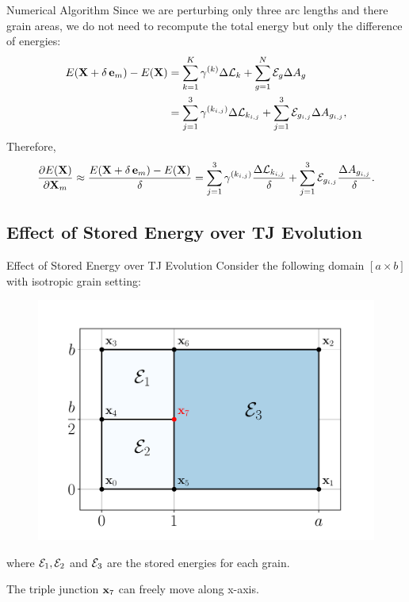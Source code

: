 \documentclass[usenames,dvipsnames]{beamer}
\begin{document}
\begin{frame}{Numerical Algorithm}
Since we are perturbing only three arc lengths and there grain areas, we do not need to recompute the total energy but only the difference of energies:
\begin{align*}
    E(\X+\delta\,  \ei{m}) - E(\X) &=  
    \sum_{k =1}^K \gamma^{(k)}\Delta{\AL}_{k} + 
     \sum_{g=1}^N \SE_{g}\Delta{A}_{g}\\
    &= \sum_{j=1}^3 \gamma^{(k_{i,j})} \Delta \AL_{k_{i,j}} + \sum_{j=1}^3 \SE_{g_{i,j}} \Delta A_{g_{i,j}},
\end{align*}
Therefore,
\begin{equation*}
    \frac{\partial E(\X)}{\partial \X_m} \approx 
    \frac{E(\X+\delta\,  \ei{m}) - E(\X)}{\delta} = \sum_{j=1}^3 \gamma^{(k_{i,j})}  \frac{\Delta \AL_{k_{i,j}}}{\delta}+ \sum_{j=1}^3 \SE_{g_{i,j}} \frac{\Delta A_{g_{i,j}}}{\delta}.
\end{equation*}
\end{frame}


\subsection[Effect of Stored Energy over TJ]{Effect of Stored Energy over TJ Evolution}
\begin{frame}{Effect of Stored Energy over TJ Evolution}
    Consider the following domain $[a \times b]$ with isotropic grain setting:
    \begin{figure}
        \centering
        \includegraphics[trim={1em 2em 1em 3em}, clip=true, scale=0.5]{figures/stored_energy/SE_analysis.pdf}
    \end{figure}
    where $\mathcal{E}_1, \mathcal{E}_2$ and $\mathcal{E}_3$ are the stored energies for each grain.
    
    The triple junction {\color{red}$\x_7$} can freely move along x-axis.
\end{frame}
\end{document}
